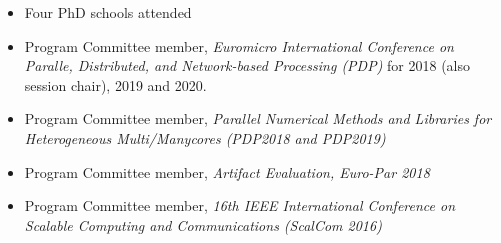 \documentclass[10pt,a4paper]{altacv}
\begin{document}
\renewcommand*{\bibfont}{\small}
\nocite{*}
\medskip
\printbibliography[heading=none]

\divider

\begin{itemize}
\item Four PhD schools attended
\item Program Committee member, \textit{Euromicro International Conference on Paralle, Distributed, and Network-based Processing (PDP)} for 2018 (also session chair), 2019 and 2020.
\item Program Committee member, \textit{Parallel Numerical Methods and Libraries for Heterogeneous Multi/Manycores (PDP2018 and PDP2019)}
\item Program Committee member, \textit{Artifact Evaluation, Euro-Par 2018}
\item Program Committee member, \textit{16th IEEE International Conference on Scalable Computing and Communications (ScalCom 2016)}
\end{itemize}
\end{document}
